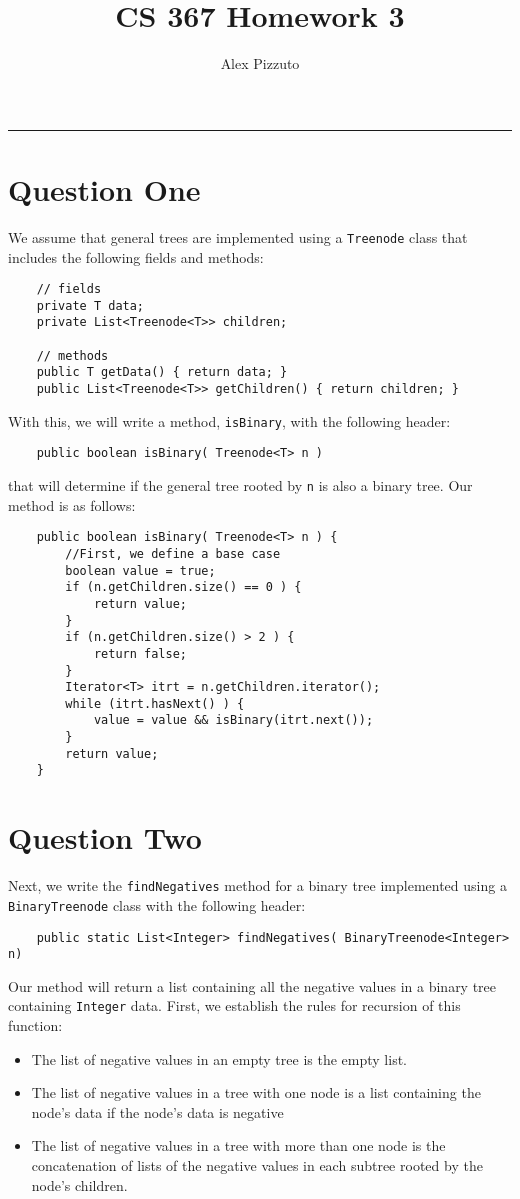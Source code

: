 \documentclass[11pt,letterpaper]{article}
\author{Alex Pizzuto}
\title{CS 367 Homework 3}
\begin{document}
\date{}
\maketitle
\hrule

\section{Question One}
We assume that general trees are implemented using a \texttt{Treenode} class that includes the following fields and methods:
\begin{lstlisting}
	// fields
	private T data;
	private List<Treenode<T>> children;
 
	// methods
	public T getData() { return data; }
	public List<Treenode<T>> getChildren() { return children; }
\end{lstlisting}
With this, we will write a method, \texttt{isBinary}, with the following header:
\begin{lstlisting}
	public boolean isBinary( Treenode<T> n )
\end{lstlisting}
that will determine if the general tree rooted by \texttt{n} is also a binary tree. Our method is as follows:
\begin{lstlisting}
	public boolean isBinary( Treenode<T> n ) {
		//First, we define a base case
		boolean value = true;
		if (n.getChildren.size() == 0 ) {
			return value;
		}
		if (n.getChildren.size() > 2 ) {
			return false;
		}
		Iterator<T> itrt = n.getChildren.iterator();
		while (itrt.hasNext() ) {
			value = value && isBinary(itrt.next());
		}
		return value;
	}	
\end{lstlisting}


\section{Question Two}
Next, we write the \texttt{findNegatives} method for a binary tree implemented using a \texttt{BinaryTreenode} class with the following header:
\begin{lstlisting}
	public static List<Integer> findNegatives( BinaryTreenode<Integer> n)
\end{lstlisting}
Our method will return a list containing all the negative values in a binary tree containing \texttt{Integer} data. First, we establish the rules for recursion of this function:
\begin{itemize}
	\item The list of negative values in an empty tree is the empty list.
	\item The list of negative values in a tree with one node is a list containing the node's data if the node's data is negative
	\item The list of negative values in a tree with more than one node is the concatenation of lists of the negative values in each subtree rooted by the node's children.
\end{itemize}
\end{document}
